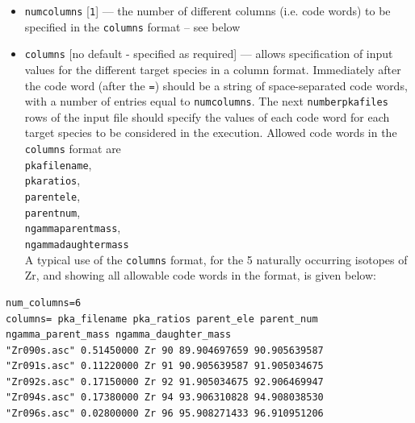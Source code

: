 \documentclass[a4paper]{article}
\begin{document}
\begin{itemize}
\item \texttt{num{\textunderscore}columns} [\texttt{1}] --- the number of different columns (i.e. code words) to be specified in the \texttt{columns} format -- see below
\item \texttt{columns} [no default - specified as required] --- allows specification of input values for the different target species in a column format. Immediately after the code word (after the \texttt{=}) should be a string of space-separated code words, with a number of entries equal to \texttt{num{\textunderscore}columns}. The next \texttt{number{\textunderscore}pka{\textunderscore}files} rows of the input file should specify the values of each code word for each target species to be considered in the execution. Allowed code words in the \texttt{columns} format are\\ \texttt{pka{\textunderscore}filename},\\\texttt{pka{\textunderscore}ratios},\\ \texttt{parent{\textunderscore}ele},\\\texttt{parent{\textunderscore}num},\\ \texttt{ngamma{\textunderscore}parent{\textunderscore}mass},\\ \texttt{ngamma{\textunderscore}daughter{\textunderscore}mass}\\
    A typical use of the \texttt{columns} format, for the 5 naturally occurring isotopes of Zr, and showing all allowable code words in the format, is given below:
\end{itemize}


{\footnotesize
\begin{verbatim}
num_columns=6
columns= pka_filename pka_ratios parent_ele parent_num ngamma_parent_mass ngamma_daughter_mass
"Zr090s.asc" 0.51450000 Zr 90 89.904697659 90.905639587
"Zr091s.asc" 0.11220000 Zr 91 90.905639587 91.905034675
"Zr092s.asc" 0.17150000 Zr 92 91.905034675 92.906469947
"Zr094s.asc" 0.17380000 Zr 94 93.906310828 94.908038530
"Zr096s.asc" 0.02800000 Zr 96 95.908271433 96.910951206
\end{verbatim}}
\end{document}
